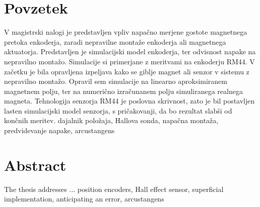 \documentclass[a4paper,twoside,openright,12pt]{book}
\begin{document}
\chapter*{Povzetek}

V magistrski nalogi je predstavljen vpliv napačno merjene gostote magnetnega pretoka enkoderja, zaradi nepravilne montaže enkoderja ali magnetnega aktuatorja. Predstavljen je simulacijski model enkoderja, ter odvisnost napake na nepravilno montažo. Simulacije si primerjane z meritvami na enkoderju RM44. 
V začetku je bila opravljena  izpeljava kako se giblje magnet ali senzor v sistemu z nepravilno montažo\cite{ursic}. Opravil sem simulacije na linearno aproksimiranem magnetnem polju, ter na numerično izračunanem polju simuliranega realnega magneta.
Tehnologija senzorja RM44 je poslovna skrivnost, zato je bil postavljen lasten simulacijski model senzorja, s pričakovanji, da bo rezultat  slabši od končnih meritev.
%
\kljucnebesede  dajalnik položaja, Hallova sonda, napačna montaža, predvidevanje napake, arcustangens
%
%
\chapter*{Abstract}
%
The thesis addresses ...
%
\keywords position encoders, Hall effect sensor, superficial implementation, anticipating an error, arcustangens
%
%





%
%
%
%
%
%
%
%
%
\end{document}
